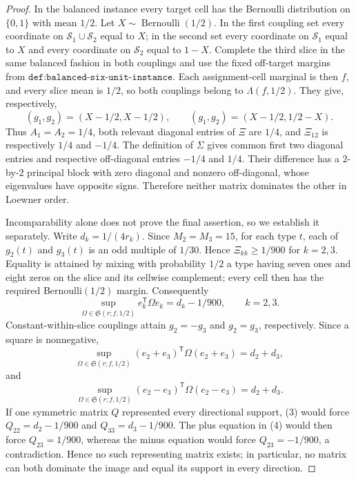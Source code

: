 \documentclass{article}
\begin{document}
\begin{proof}
In the balanced instance every target cell has the Bernoulli distribution on \(\{0,1\}\) with mean \(1/2\). Let \(X\sim\operatorname{Bernoulli}(1/2)\). In the first coupling set every coordinate on \(\mathcal S_1\cup\mathcal S_2\) equal to \(X\); in the second set every coordinate on \(\mathcal S_1\) equal to \(X\) and every coordinate on \(\mathcal S_2\) equal to \(1-X\). Complete the third slice in the same balanced fashion in both couplings and use the fixed off-target margins from \(\texttt{def:balanced-six-unit-instance}\). Each assignment-cell marginal is then \(f\), and every slice mean is \(1/2\), so both couplings belong to \(\Lambda(f,1/2)\). They give, respectively,
\[
(g_1,g_2)=(X-1/2,X-1/2),\qquad
(g_1,g_2)=(X-1/2,1/2-X).
\]
Thus \(A_1=A_2=1/4\), both relevant diagonal entries of \(\Xi\) are \(1/4\), and \(\Xi_{12}\) is respectively \(1/4\) and \(-1/4\). The definition of \(\Sigma\) gives common first two diagonal entries and respective off-diagonal entries \(-1/4\) and \(1/4\). Their difference has a \(2\)-by-\(2\) principal block with zero diagonal and nonzero off-diagonal, whose eigenvalues have opposite signs. Therefore neither matrix dominates the other in Loewner order.

Incomparability alone does not prove the final assertion, so we establish it separately. Write \(d_k=1/(4r_k)\). Since \(M_2=M_3=15\), for each type \(t\), each of \(g_2(t)\) and \(g_3(t)\) is an odd multiple of \(1/30\). Hence \(\Xi_{kk}\ge1/900\) for \(k=2,3\). Equality is attained by mixing with probability \(1/2\) a type having seven ones and eight zeros on the slice and its cellwise complement; every cell then has the required Bernoulli\((1/2)\) margin. Consequently
\[
\sup_{\Omega\in\mathfrak S(r;f,1/2)}e_k^{\mathsf T}\Omega e_k=d_k-1/900,\qquad k=2,3.
\tag{3}
\]
Constant-within-slice couplings attain \(g_2=-g_3\) and \(g_2=g_3\), respectively. Since a square is nonnegative,
\[
\sup_{\Omega\in\mathfrak S(r;f,1/2)}(e_2+e_3)^{\mathsf T}\Omega(e_2+e_3)=d_2+d_3,
\]
and
\[
\sup_{\Omega\in\mathfrak S(r;f,1/2)}(e_2-e_3)^{\mathsf T}\Omega(e_2-e_3)=d_2+d_3.
\tag{4}
\]
If one symmetric matrix \(Q\) represented every directional support, (3) would force \(Q_{22}=d_2-1/900\) and \(Q_{33}=d_3-1/900\). The plus equation in (4) would then force \(Q_{23}=1/900\), whereas the minus equation would force \(Q_{23}=-1/900\), a contradiction. Hence no such representing matrix exists; in particular, no matrix can both dominate the image and equal its support in every direction.
\end{proof}
\end{document}
